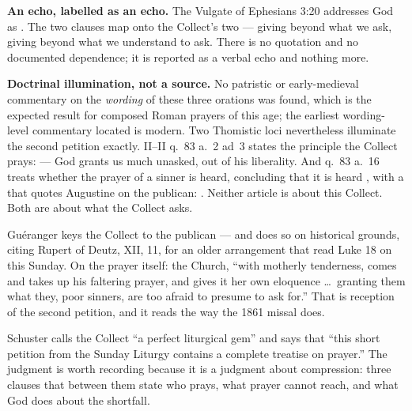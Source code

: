 \textbf{An echo, labelled as an echo.} The Vulgate of Ephesians 3:20 addresses
God as . The two clauses map onto the Collect's two --- giving beyond
what we ask, giving beyond what we understand to ask. There is no quotation and
no documented dependence; it is reported as a verbal echo and nothing more.

\textbf{Doctrinal illumination, not a source.} No patristic or early-medieval
commentary on the \textit{wording} of these three orations was found, which is
the expected result for composed Roman prayers of this age; the earliest
wording-level commentary located is modern. Two Thomistic loci nevertheless
illuminate the second petition exactly.  II--II q.~83
a.~2 ad~3 states the principle the Collect prays:  --- God grants us much unasked,
out of his liberality. And q.~83 a.~16 treats whether the prayer of a sinner is
heard, concluding that it is heard , with a  that quotes Augustine on the
publican: . Neither article is about this Collect.
Both are about what the Collect asks.

\begin{witnessnote}
Guéranger keys the Collect to the publican --- and does so on historical
grounds, citing Rupert of Deutz,  XII, 11, for an
older arrangement that read Luke 18 on this Sunday. On the prayer itself:
the Church, ``with motherly tenderness, comes and takes up his faltering
prayer, and gives it her own eloquence \dots\ granting them what they, poor
sinners, are too afraid to presume to ask for.'' That is reception of the
second petition, and it reads  the way the 1861 missal does.
\end{witnessnote}

\begin{witnessnote}
Schuster calls the Collect ``a perfect liturgical gem'' and says that ``this
short petition from the Sunday Liturgy contains a complete treatise on
prayer.'' The judgment is worth recording because it is a judgment about
compression: three clauses that between them state who prays, what prayer
cannot reach, and what God does about the shortfall.
\end{witnessnote}

